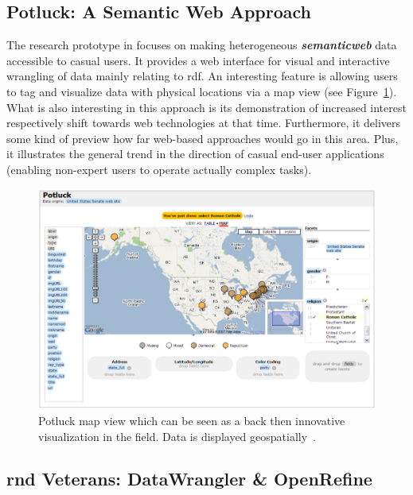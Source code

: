 \subsection{Potluck: A Semantic Web Approach}

The research prototype in \cite{Huynh2007} focuses on making heterogeneous \textbf{\emph{\gls{semanticweb}}} data accessible to casual users.
It provides a web interface for visual and interactive wrangling of data mainly relating to \gls{rdf}.
An interesting feature is allowing users to tag and visualize data with physical locations via a map view (see Figure~\ref{fig:potluck-map-screenshot}).
What is also interesting in this approach is its demonstration of increased interest respectively shift towards web technologies at that time.
Furthermore, it delivers some kind of preview how far web-based approaches would go in this area.
Plus, it illustrates the general trend in the direction of casual end-user applications (enabling non-expert users to operate actually complex tasks).

\begin{figure}[h]
  \centering
  \includegraphics[width=1.0\textwidth]{figures/state-of-the-art/potluck-map-view}
  \caption{Potluck map view which can be seen as a back then innovative visualization in the field. Data is displayed geospatially~\cite{Huynh2007}.}
  \label{fig:potluck-map-screenshot}
\end{figure}

\newpage


\subsection{\gls{rnd} Veterans: DataWrangler \& OpenRefine}

